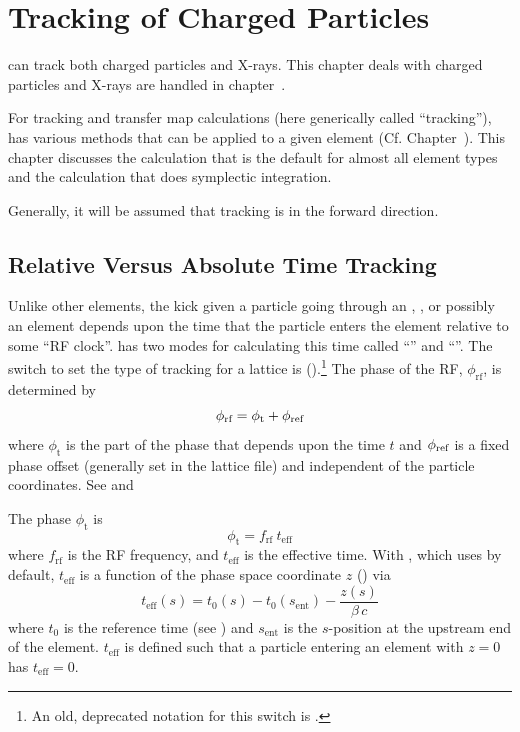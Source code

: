 \chapter{Tracking of Charged Particles}
\label{c:charged.track}

\bmad can track both charged particles and X-rays. This chapter deals with charged particles and
X-rays are handled in chapter~.

For tracking and transfer map calculations (here generically called ``tracking''), \bmad has various
methods that can be applied to a given element (Cf. Chapter~). This chapter
discusses the  calculation that is the default for almost all element types and
the  calculation that does symplectic integration.

Generally, it will be assumed that tracking is in the forward direction.

\section{Relative Versus Absolute Time Tracking}
\label{s:rf.time}

Unlike other elements, the kick given a particle going through an , , or
possibly an  element depends upon the time that the particle enters the element
relative to some ``RF clock''. \bmad has two modes for calculating this time called ``'' and ``''. The switch to set the type of tracking for a
lattice is  ().\footnote
  {
An old, deprecated notation for this switch is .
  }
The phase of the RF, $\phi_\text{rf}$, is determined by
\begin{equation}
  \phi_\text{rf} = \phi_\text{t} + \phi_{\text{ref}}
\end{equation}
where $\phi_\text{t}$ is the part of the phase that depends upon the time $t$ and $\phi_{\text{ref}}$
is a fixed phase offset (generally set in the lattice file) and independent of the particle
coordinates. See  and 

The phase $\phi_\text{t}$ is 
\begin{equation}
  \phi_\text{t} = f_\text{rf} \ t_\text{eff}
\end{equation}
where $f_\text{rf}$ is the RF frequency, and $t_\text{eff}$ is the effective time. With , which \bmad uses by default, $t_\text{eff}$ is a function of the 
phase space coordinate $z$ () via
\begin{equation}
  t_\text{eff}(s) = t_0(s) - t_0(s_\text{ent}) - \frac{z(s)}{\beta \, c}
  \label{tttz}
\end{equation}
where $t_0$ is the reference time (see ) and $s_\text{ent}$ is the $s$-position at the
upstream end of the element. $t_\text{eff}$ is defined such that a particle entering an element 
with $z = 0$ has $t_\text{eff} = 0$.

